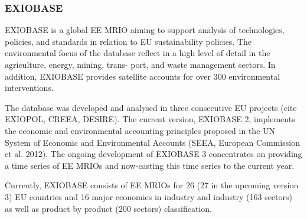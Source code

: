 \subsubsection{EXIOBASE}


EXIOBASE is a global EE MRIO aiming to support analysis of technologies,
policies, and standards in relation to EU sustainability policies. The
environmental focus of the database reflect in a high level of detail in the
agriculture, energy, mining, trans- port, and waste management sectors. In
addition, EXIOBASE provides satellite accounts for over 300 environmental
interventions.  

The database was developed and analysed in three consecutive EU projects (cite
EXIOPOL, CREEA, DESIRE). The current version, EXIOBASE 2, implements the
economic and environmental accounting principles proposed in the UN System of
Economic and Environmental Accounts (SEEA, European Commission et al. 2012).
The ongoing development of EXIOBASE 3 concentrates on providing a time series
of EE MRIOs and now-casting this time series to the current year. 

Currently, EXIOBASE consists of EE MRIOs for 26 (27 in the upcoming version 3) EU countries
and 16 major economies in industry and industry (163 sectors) as well as
product by product (200 sectors) classification.